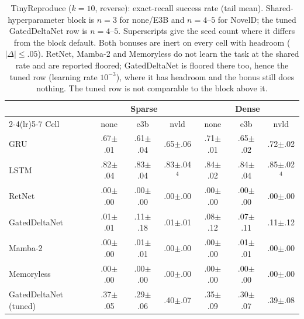 \begin{table}[t]\centering
\caption{TinyReproduce ($k{=}10$, reverse): exact-recall success rate (tail mean). Shared-hyperparameter block is $n{=}3$ for none/E3B and $n{=}4$--$5$ for NovelD; the tuned GatedDeltaNet row is $n{=}4$--$5$. Superscripts give the seed count where it differs from the block default. Both bonuses are inert on every cell with headroom ($|\Delta|{\le}.05$). RetNet, Mamba-2 and Memoryless do not learn the task at the shared rate and are reported floored; GatedDeltaNet is floored there too, hence the tuned row (learning rate $10^{-3}$), where it has headroom and the bonus still does nothing. The tuned row is not comparable to the block above it.}
\label{tab:tiny}\small\setlength{\tabcolsep}{5pt}
\begin{tabular}{@{}l ccc ccc@{}}\toprule
 & \multicolumn{3}{c}{Sparse} & \multicolumn{3}{c}{Dense} \\
\cmidrule(lr){2-4}\cmidrule(lr){5-7}
Cell & none & e3b & nvld & none & e3b & nvld \\\midrule
GRU & .67{\scriptsize$\pm$.01} & .61{\scriptsize$\pm$.04} & .65{\scriptsize$\pm$.06} & .71{\scriptsize$\pm$.01} & .65{\scriptsize$\pm$.02} & .72{\scriptsize$\pm$.02} \\
LSTM & .82{\scriptsize$\pm$.04} & .83{\scriptsize$\pm$.04} & .83{\scriptsize$\pm$.04}$^{4}$ & .84{\scriptsize$\pm$.02} & .84{\scriptsize$\pm$.04} & .85{\scriptsize$\pm$.02}$^{4}$ \\
RetNet & .00{\scriptsize$\pm$.00} & .00{\scriptsize$\pm$.00} & .00{\scriptsize$\pm$.00} & .00{\scriptsize$\pm$.00} & .00{\scriptsize$\pm$.00} & .00{\scriptsize$\pm$.00} \\
GatedDeltaNet & .01{\scriptsize$\pm$.01} & .11{\scriptsize$\pm$.18} & .01{\scriptsize$\pm$.01} & .08{\scriptsize$\pm$.12} & .07{\scriptsize$\pm$.11} & .11{\scriptsize$\pm$.12} \\
Mamba-2 & .00{\scriptsize$\pm$.00} & .01{\scriptsize$\pm$.01} & .00{\scriptsize$\pm$.00} & .00{\scriptsize$\pm$.00} & .01{\scriptsize$\pm$.01} & .00{\scriptsize$\pm$.00} \\
Memoryless & .00{\scriptsize$\pm$.00} & .00{\scriptsize$\pm$.00} & .00{\scriptsize$\pm$.00} & .00{\scriptsize$\pm$.00} & .00{\scriptsize$\pm$.00} & .00{\scriptsize$\pm$.00} \\
\midrule
GatedDeltaNet (tuned) & .37{\scriptsize$\pm$.05} & .29{\scriptsize$\pm$.06} & .40{\scriptsize$\pm$.07} & .35{\scriptsize$\pm$.09} & .30{\scriptsize$\pm$.07} & .39{\scriptsize$\pm$.08} \\
\bottomrule\end{tabular}\end{table}

